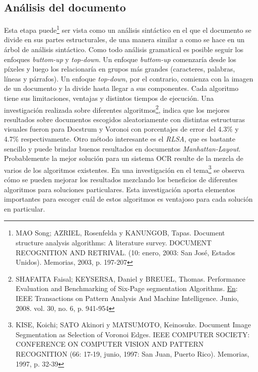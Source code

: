 \documentclass[a4paper, 11pt, oneside]{report}
\begin{document}
\subsection{Análisis del documento}
Esta etapa puede\footnote{MAO Song; AZRIEL, Rosenfelda y KANUNGOB, Tapas. Document structure analysis algorithms: A literature survey. DOCUMENT RECOGNITION AND RETRIVAL. (10: enero, 2003: San José, Estados Unidos). Memorias, 2003, p. 197-207} ser vista como un análisis sintáctico en el que el documento se divide en sus partes estructurales, de una manera similar a como se hace en un árbol de análisis sintáctico. Como todo análisis gramatical es posible seguir los enfoques \textit{buttom-up} y \textit{top-down}. Un enfoque \textit{buttom-up} comenzaría desde los píxeles y luego los relacionaría en grupos más grandes (caracteres, palabras, líneas y párrafos). Un enfoque \textit{top-down}, por el contrario, comienza con la imagen de un documento y la divide hasta llegar a sus componentes. Cada algoritmo tiene sus limitaciones, ventajas y distintos tiempos de ejecución. Una investigación realizada sobre diferentes algoritmos\footnote{SHAFAITA Faisal; KEYSERSA, Daniel y BREUEL, Thomas. Performance Evaluation and Benchmarking of Six-Page segmentation Algorithms. \underline{En}: IEEE Transactions on Pattern Analysis And Machine Intelligence. Junio, 2008. vol. 30, no. 6, p. 941-954}, indica que los mejores resultados sobre documentos escogidos aleatoriamente con distintas estructuras visuales fueron para Docstrum y Voronoi con porcentajes de error del 4.3\% y 4.7\% respectivamente. Otro método interesante es el \textit{RLSA}, que es bastante sencillo y puede brindar buenos resultados en documentos \textit{Manhattan-Layout}. 
Probablemente la mejor solución para un sistema OCR resulte de la mezcla de varios de los algoritmos existentes. En una investigación en el tema\footnote{KISE, Koichi; SATO Akinori y MATSUMOTO, Keinosuke. Document Image Segmentation as Selection of Voronoi Edges. IEEE COMPUTER SOCIETY: CONFERENCE ON COMPUTER VISION AND PATTERN RECOGNITION (66: 17-19, junio, 1997: San Juan, Puerto Rico). Memorias, 1997, p. 32-39} se observa cómo se pueden mejorar los resultados mezclando los beneficios de diferentes algoritmos para soluciones particulares. Esta investigación aporta elementos importantes para escoger cuál de estos algoritmos es ventajoso para cada solución en particular. 
\end{document}
